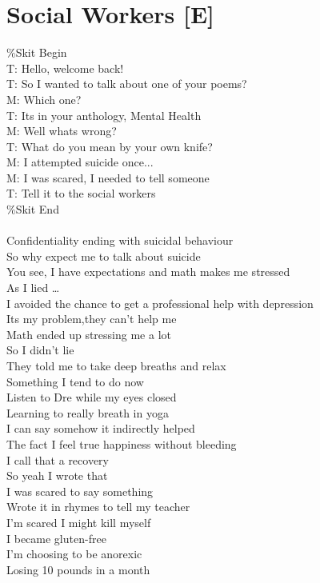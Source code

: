 \documentclass[12pt, b5paper, oneside]{book}
\begin{document}
\newpage
\section{Social Workers [E]}
\%Skit Begin
\\T: Hello, welcome back!
\\T: So I wanted to talk about one of your poems?
\\M: Which one?
\\T: Its in your anthology, Mental Health
\\M: Well whats wrong?
\\T: What do you mean by your own knife?
\\M: I attempted suicide once...
\\M: I was scared, I needed to tell someone
\\T: Tell it to the social workers
\\\%Skit End
%
\\\\Confidentiality ending with suicidal behaviour
\\So why expect me to talk about suicide
\\You see, I have expectations and math makes me stressed
\\As I lied \dots  
\\I avoided the chance to get a professional help with depression
\\Its my problem,they can't help me
\\Math ended up stressing me a lot
\\So I didn't lie
\\They told me to take deep breaths and relax
\\Something I tend to do now
\\Listen to Dre while my eyes closed
\\Learning to really breath in yoga
\\I can say somehow it indirectly helped
\\The fact I feel true happiness without bleeding
\\I call that a recovery
\\So yeah I wrote that
\\I was scared to say something
\\Wrote it in rhymes to tell my teacher
\\I'm scared I might kill myself
\\I became gluten-free
\\I'm choosing to be anorexic
\\Losing 10 pounds in  a month
\end{document}
